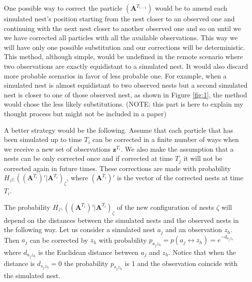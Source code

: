\documentclass{article}
\renewcommand{\vec}[1]{\mathbf{#1}}
\begin{document}
One possible way to correct the particle $(\vec{A}^{T_{i-1}})$ would be to amend each simulated nest's position starting from the nest closer to an observed one and continuing with the next nest closer to another observed one and so on until we we have corrected all particles with all the available observations. This way we will have only one possible substitution and our corrections will be deterministic. This method, although simple, would be undefined in the remote scenario where two observations are exactly equidistant to a simulated nest. It would also discard more probable scenarios in favor of less probable one. For example, when a simulated nest is almost equidistant to two observed nests but a second simulated nest is closer to one of those observed nest, as shown in Figure \ref{fig:1}, the method would chose the less likely substitutions. (NOTE: this part is here to explain my thought process but might not be included in a paper)

\begin{figure*}
\centering
\caption{[A] shows the shortest distance substitution in the deterministic scenario. [B] shows the more likely substitution that would be discarded in the deterministic scenario.}
\label{fig:1}
\end{figure*}

A better strategy would be the following. Assume that each particle that has been simulated up to time $T_i$ can be corrected in a finite number of ways when we receive a new set of observations $\vec{z}^{T_i}$. We also make the assumption that a nests can be only corrected once and if corrected at time $T_j$ it will not be corrected again in future times. These corrections are made with probability $H_{z^{T_i}}((\vec{A}^{T_i})' | \vec{A}^{T_i})_{\zeta}$, where $(\vec{A}^{T_i})'$ is the vector of the corrected nests at time $T_i$.

The probability $H_{z^{\tau_i}}((\vec{A}^{T_i})' | \vec{A}^{T_i})_{\zeta}$ of the new configuration of nests $\zeta$ will depend on the distances between the simulated nests and the observed nests in the following way. Let us consider a simulated nest $a_j$ and an observation $z_h$. Then $a_j$ can be corrected by $z_h$ with probability $p_{a_j z_h} = p(a_j \leftrightarrow z_h) = e^{-d_{a_j z_h}}$ where $d_{a_j z_h}$ is the Euclidean distance between $a_j$ and $z_h$. Notice that when the distance is $d_{s_j z_h} = 0$ the probability $p_{s_j z_h}$ is 1 and the observation coincide with the simulated nest. 
\end{document}
